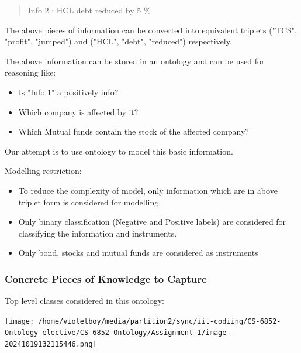 \documentclass[
]{article}
\begin{document}
\begin{quote}
Info 2 : HCL debt reduced by 5 \%
\end{quote}

The above pieces of information can be converted into equivalent
triplets ("TCS", "profit", "jumped") and ("HCL", "debt", "reduced")
respectively.

The above information can be stored in an ontology and can be used for
reasoning like:

\begin{itemize}
\item
  Is "Info 1" a positively info?
\item
  Which company is affected by it?
\item
  Which Mutual funds contain the stock of the affected company?
\end{itemize}

Our attempt is to use ontology to model this basic information.

Modelling restriction:

\begin{itemize}
\item
  To reduce the complexity of model, only information which are in above
  triplet form is considered for modelling.
\item
  Only binary classification (Negative and Positive labels) are
  considered for classifying the information and instruments.
\item
  Only bond, stocks and mutual funds are considered as instruments
\end{itemize}

\subsubsection{Concrete Pieces of Knowledge to
Capture}\label{concrete-pieces-of-knowledge-to-capture}

Top level classes considered in this ontology:

\texttt{[image: /home/violetboy/media/partition2/sync/iit-codiing/CS-6852-Ontology-elective/CS-6852-Ontology/Assignment 1/image-20241019132115446.png]}
\end{document}

